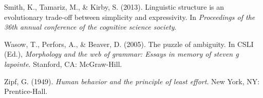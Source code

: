 \documentclass[10pt, letterpaper]{article}
\begin{document}
\hypertarget{ref-SmithTamarizKirby2013a}{}
Smith, K., Tamariz, M., \& Kirby, S. (2013). Linguistic structure is an
evolutionary trade-off between simplicity and expressivity. In
\emph{Proceedings of the 36th annual conference of the cognitive science
society}.

\hypertarget{ref-WasowPerforsBeaver2005a}{}
Wasow, T., Perfors, A., \& Beaver, D. (2005). The puzzle of ambiguity.
In CSLI (Ed.), \emph{Morphology and the web of grammar: Essays in memory
of steven g lapointe}. Stanford, CA: McGraw-Hill.

\hypertarget{ref-Zipf1949a}{}
Zipf, G. (1949). \emph{Human behavior and the principle of least
effort}. New York, NY: Prentice-Hall.


\end{document}

